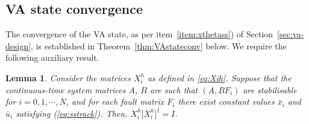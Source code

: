 \documentclass[letterpaper, 10 pt, conference]{ieeeconf}
\newtheorem{lem}{Lemma}
\begin{document}
\subsection{VA state convergence}
\label{sec:const-ss-vsr}
The convergence of the VA state, as per item~\ref{item:xthetass}) of
Section~\ref{sec:va-design}, is established in
Theorem~\ref{thm:VAstateconv} below. We require the following
auxiliary result.
\begin{lem}
  \label{lem:nihprops}
  Consider the matrices $X_i^h$ as defined in \eqref{eq:Xih}. Suppose
  that the continuous-time system matrices $A$, $B$ are such that
  $(A,BF_i)$ are stabilisable for $i = 0,1,\cdots,N$, and for each
  fault matrix $F_i$ there exist constant values $\bar x_i$ and $\bar
  u_i$ satisfying (\ref{eq:sstrack}). Then, $X_i^h \big[ X_i^h
  \big]^\dagger = I$.
\end{lem}
\end{document}
